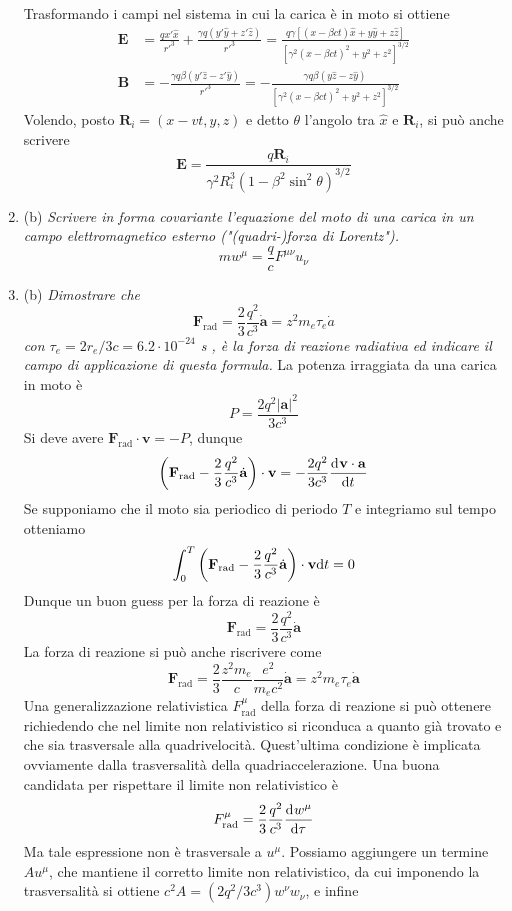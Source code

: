 \documentclass{article}
\renewcommand{\b}{(b)}
\renewcommand{\t}[1]{\textit{ #1}}
\renewcommand{\vec}[1]{\mathbf{#1}}
\begin{document}
\begin{enumerate}
	Trasformando i campi nel sistema in cui la carica è in moto si ottiene
	\begin{align*}
		\vec{E}&=\frac{qx'\hat{x}}{r'^3}+\frac{\gamma q(y'\hat{y}+z'\hat{z})}{r'^3}=\frac{q\gamma[(x-\beta ct)\hat{x}+y\hat{y}+z\hat{z}]}{[\gamma^2(x-\beta ct)^2+y^2+z^2]^{3/2}}\\
		\vec{B}&=-\frac{\gamma q\beta(y'\hat{z}-z'\hat{y})}{r'^3}=-\frac{\gamma q\beta(y\hat{z}-z\hat{y})}{[\gamma^2(x-\beta ct)^2+y^2+z^2]^{3/2}}
	\end{align*}
	Volendo, posto $\vec{R}_i=(x-vt,y,z)$ e detto $\theta$ l'angolo tra $\hat{x}$ e $\vec{R}_i$, si può anche scrivere
	\[\vec{E}=\frac{q\vec{R}_i}{\gamma^2 R_i^3(1-\beta^2\sin^2\theta)^{3/2}}\]
	\item\b\t{Scrivere in forma covariante l'equazione del moto di una carica in un campo
		elettromagnetico esterno ("(quadri-)forza di Lorentz").}
	\[mw^\mu=\frac{q}{c}F^{\mu\nu}u_\nu\]
	\item\b\t{Dimostrare che \[\vec{F}_\mathrm{rad}=\frac{2}{3}\frac{q^2}{c^3}\dot{\vec{a}}=z^2m_e\tau_e\dot{a}\]
		con $\tau_e = 2r_e/3c=6.2\cdot10^{-24}$
		s , è la forza di
		reazione radiativa ed indicare il campo di applicazione di questa formula.}
	La potenza irraggiata da una carica in moto è
	\[P=\frac{2q^2|\vec{a}|^2}{3c^3}\]
	Si deve avere $\vec{F}_\textrm{rad}\cdot\vec{v}=-P$, dunque
	\[\left(\vec{F}_\textrm{rad}-\frac{2}{3}\frac{q^2}{c^3}\dot{\vec{a}}\right)\cdot\vec{v}=-\frac{2q^2}{3c^3}\der{\vec{v}\cdot\vec{a}}{t}\]
	Se supponiamo che il moto sia periodico di periodo $T$ e integriamo sul tempo otteniamo
	\[\int_{0}^{T}\left(\vec{F}_\textrm{rad}-\frac{2}{3}\frac{q^2}{c^3}\dot{\vec{a}}\right)\cdot\vec{v}\d t=0\]
	Dunque un buon guess per la forza di reazione è
	\[\vec{F}_\textrm{rad}=\frac{2}{3}\frac{q^2}{c^3}\dot{\vec{a}}\]
	La forza di reazione si può anche riscrivere come
	\[\vec{F}_\textrm{rad}=\frac{2}{3}\frac{z^2m_e}{c}\frac{e^2}{m_ec^2}\dot{\vec{a}}=z^2m_e\tau_e\dot{\vec{a}}\]
	Una generalizzazione relativistica $F^{\mu}_\textrm{rad}$ della forza di reazione si può ottenere richiedendo che nel limite non relativistico si riconduca a quanto già trovato e che sia trasversale alla quadrivelocità. Quest'ultima condizione è implicata ovviamente dalla trasversalità della quadriaccelerazione. Una buona candidata per rispettare il limite non relativistico è
	\[F^{\mu}_\textrm{rad}=\frac{2}{3}\frac{q^2}{c^3}\dfrac{\mathrm{d} ^{}w^\mu}{\mathrm{d} {\tau}^{}}\]
	Ma tale espressione non è trasversale a $u^\mu$. Possiamo aggiungere un termine $Au^\mu$, che mantiene il corretto limite non relativistico, da cui imponendo la trasversalità si ottiene $c^2A=(2q^2/3c^3)w^\nu w_\nu$, e infine

\end{enumerate}
\end{document}
